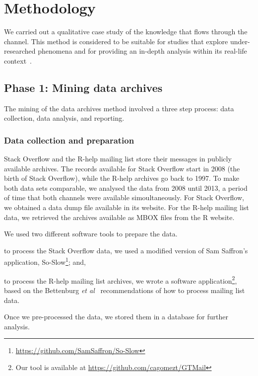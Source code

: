 \section{Methodology}
\label{cha:methodology}

    We carried out a qualitative case study of the knowledge that flows through the channel. 
    This method is considered to be suitable for studies that explore under-researched phenomena and for providing an in-depth analysis within its real-life context~\cite{Yin2009}.

\subsection{Phase 1: Mining data archives} 
\label{sec:studyDesign}

	The mining of the data archives method involved a three step process: data collection, data analysis, and reporting.%

\subsubsection{Data collection and preparation}
\label{subsec:preparation}

	Stack Overflow and the R-help mailing list store their messages in publicly available archives.
	The records available for Stack Overflow start in 2008 (the birth of Stack Overflow), while the R-help archives go back to 1997.
	To make both data sets comparable, we analysed the data from 2008 until 2013, a period of time that both channels were available simoultaneously.
    For Stack Overflow, we obtained a data dump file available in its website.
    For the R-help mailing list data, we retrieved the archives available as MBOX files from the R website.

	We used two different software tools to prepare the data.
	\begin{enumerate*}[label=(\arabic*)]
	\item to process the Stack Overflow data, we used a modified version of Sam Saffron's application, So-Slow\footnote{\url{https://github.com/SamSaffron/So-Slow}}; and,
	\item to process the R-help mailing list archives, we wrote a software application\footnote{Our tool is available at \url{https://github.com/cagomezt/GTMail}}, based on the Bettenburg \textit{et al}~\cite{Bettenburg2009} recommendations of how to process mailing list data.
	\end{enumerate*}
    Once we pre-processed the data, we stored them in a database for further analysis.

